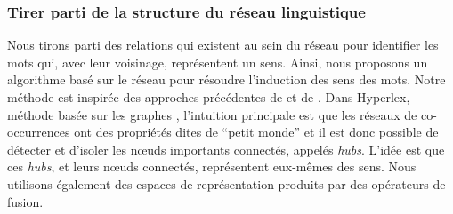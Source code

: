 \documentclass[a4paper,11pt,twoside]{article}
\begin{document}
\subsubsection{Tirer parti de la structure du réseau linguistique}
%
%


Nous tirons parti des relations qui existent au sein du réseau pour identifier les mots qui, avec leur voisinage, représentent un sens. Ainsi, nous proposons un algorithme basé sur le réseau pour résoudre l'induction des sens des mots.
Notre méthode est inspirée des approches précédentes de \cite {2004.Veronis} et de \cite{2007.Klapaftis.UoY}. Dans Hyperlex, méthode basée sur les graphes \cite{2004.Veronis}, l'intuition principale est que les réseaux de co-occurrences ont des propriétés dites de ``petit monde'' et il est donc possible de détecter et d'isoler les n\oe uds importants connectés, appelés \textit{hubs}. L'idée est que ces \textit{hubs}, et leurs n\oe uds connectés, représentent eux-mêmes des sens. Nous utilisons également des espaces de représentation produits par des opérateurs de fusion.
\end{document}
